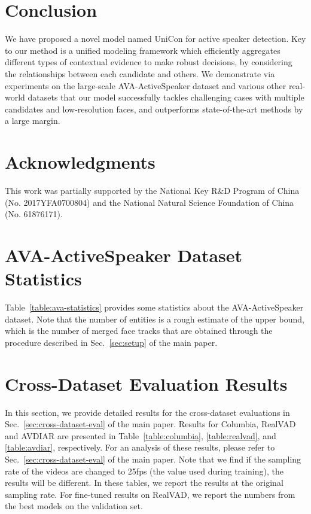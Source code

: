 \documentclass[sigconf]{acmart}
\newcommand\NetName{UniCon}
\begin{document}
\begin{CCSXML}
\section{Conclusion}
We have proposed a novel model named \NetName{} for active speaker detection. Key to our method is a unified modeling framework which efficiently aggregates different types of contextual evidence to make robust decisions, by considering the relationships between each candidate and others. We demonstrate via experiments on the large-scale AVA-ActiveSpeaker dataset and various other real-world datasets that our model successfully tackles challenging cases with multiple candidates and low-resolution faces, and outperforms state-of-the-art methods by a large margin.
\vspace{-1.5ex} 
\section*{Acknowledgments}
This work was partially supported by the National Key R\&D Program of China (No. 2017YFA0700804) and the National Natural Science Foundation of China (No. 61876171).

\begin{Appendix}
	\section{AVA-ActiveSpeaker Dataset Statistics}
	Table~\ref{table:ava-statistics} provides some statistics about the AVA-ActiveSpeaker dataset. Note that the number of entities is a rough estimate of the upper bound, which is the number of merged face tracks that are obtained through the procedure described in Sec.~\ref{sec:setup} of the main paper.
\section{Cross-Dataset Evaluation Results}
	In this section, we provide detailed results for the cross-dataset evaluations in Sec.~\ref{sec:cross-dataset-eval} of the main paper. Results for Columbia, RealVAD and AVDIAR are presented in Table~\ref{table:columbia}, \ref{table:realvad}, and \ref{table:avdiar}, respectively. For an analysis of these results, please refer to Sec.~\ref{sec:cross-dataset-eval} of the main paper. Note that we find if the sampling rate of the videos are changed to 25fps (the value used during training), the results will be different. In these tables, we report the results at the original sampling rate. For fine-tuned results on RealVAD, we report the numbers from the best models on the validation set.
	

\end{Appendix}
\end{CCSXML}
\end{document}
